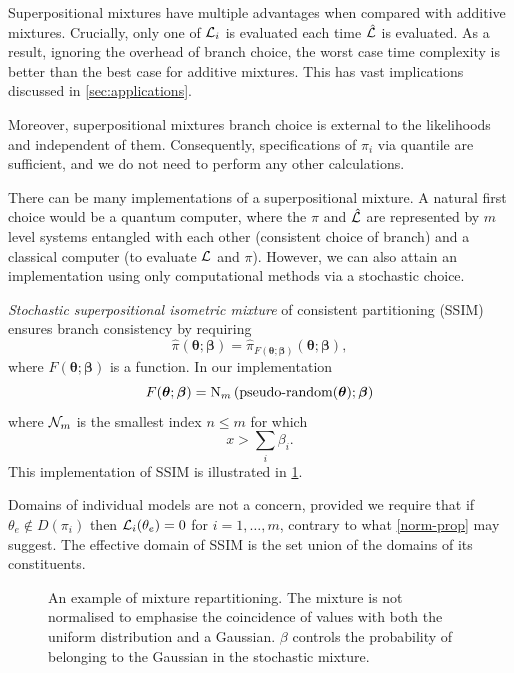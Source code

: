 \documentclass[usenatbib]{mnras}
\begin{document}
Superpositional mixtures have multiple advantages when compared with
additive mixtures. Crucially, only one of ${\cal L}_{i}$ is evaluated
each time $\hat{\cal L}$ is evaluated. As a result, ignoring the
overhead of branch choice, the worst case time complexity is better
than the best case for additive mixtures. This has vast implications
discussed in \cref{sec:applications}.

Moreover, superpositional mixtures branch choice is external to the
likelihoods and independent of them. Consequently, specifications of
$\pi_{i}$ via quantile are sufficient, and we do not need to perform
any other calculations.


There can be many implementations of a superpositional mixture. A
natural first choice would be a quantum computer, where the
$\hat{\pi}$ and $\hat{\cal L}$ are represented by \(m\) level
systems entangled with each other (consistent choice of branch) and a
classical computer (to evaluate ${\cal L}$ and $\pi$). However, we can
also attain an implementation using only computational methods via a
stochastic choice.

\emph{Stochastic superpositional isometric mixture} of consistent
partitioning (SSIM) ensures branch consistency by requiring
\begin{equation}
\hat{\pi}(\bm{\theta}; \bm{\beta}) = \hat{\pi}_{F(\bm{\theta};
  \bm{\beta})}(\bm{\theta};\bm{\beta}),
\end{equation}
where $F(\bm{\theta}; \bm{\beta})$ is a function. In our implementation
\begin{equation}
  F(\bm{\theta};\bm{\beta})= \text{{\cal N}}_{m}\left(\text{pseudo-random}(\bm{\theta}); \bm{\beta}\right)
\end{equation}
where \({\cal N}_{m}\) is the smallest index \(n \leq m\) for
which
\begin{equation}
x > \sum_{i}\beta_{i}.
\end{equation}
This implementation of SSIM is illustrated in \cref{fig:mixture}.

Domains of individual models are not a concern, provided we require
that if $\theta_{e} \not\in D(\pi_{i})$ then
${\cal L}_{i}(\theta_{e})=0$ for $i=1,\ldots,m$, contrary to what
\cref{norm-prop} may suggest. The effective domain of SSIM is the
set union of the domains of its constituents.

\begin{figure}  
  

  

  
  \caption{An example of mixture repartitioning. The mixture is not
    normalised to emphasise the coincidence of values with both the
    uniform distribution and a Gaussian. $\beta$ controls the
    probability of belonging to the Gaussian in the stochastic
    mixture.  \label{fig:mixture}}
\end{figure}
\end{document}
